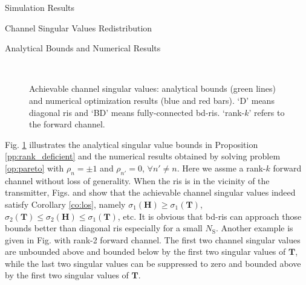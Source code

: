 \documentclass[journal]{IEEEtran}
\begin{document}
\begin{section}{Simulation Results}
\begin{subsection}{Channel Singular Values Redistribution}
		\begin{subsubsection}{Analytical Bounds and Numerical Results}
			\begin{figure}[!t]
				\centering
				\\
				\caption{
					Achievable channel singular values: analytical bounds (green lines) and numerical optimization results (blue and red bars).
					`D' means diagonal \gls{ris} and `BD' means fully-connected \gls{bd}-\gls{ris}.
					`rank-$k$' refers to the forward channel.
				}
				\label{fg:singular_bound}
			\end{figure}
			Fig. \ref{fg:singular_bound} illustrates the analytical singular value bounds in Proposition \ref{pp:rank_deficient} and the numerical results obtained by solving problem \eqref{op:pareto} with $\rho_n = \pm 1$ and $\rho_{n'} = 0$, $\forall n' \ne n$.
			Here we assme a rank-$k$ forward channel without loss of generality.
			When the \gls{ris} is in the vicinity of the transmitter, Figs.  and  show that the achievable channel singular values indeed satisfy Corollary \ref{co:los}, namely $\sigma_1(\mathbf{H}) \ge \sigma_1(\mathbf{T})$, $\sigma_2(\mathbf{T}) \le \sigma_2(\mathbf{H}) \le \sigma_1(\mathbf{T})$, etc.
			It is obvious that \gls{bd}-\gls{ris} can approach those bounds better than diagonal \gls{ris} especially for a small $N_\mathrm{S}$.
			Another example is given in Fig.  with rank-2 forward channel.
			The first two channel singular values are unbounded above and bounded below by the first two singular values of $\mathbf{T}$, while the last two singular values can be suppressed to zero and bounded above by the first two singular values of $\mathbf{T}$.

\end{subsubsection}
\end{subsection}
\end{section}
\end{document}
